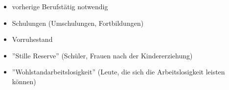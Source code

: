 \documentclass[a4paper]{report}
\begin{document}
\begin{itemize}
\item vorherige Berufstätig notwendig
\item Schulungen (Umschulungen, Fortbildungen)
\item Vorruhestand 
\item ''Stille Reserve'' (Schüler, Frauen nach der Kindererziehung)
\item ''Wohlstandarbeitslosigkeit'' (Leute, die sich die Arbeitslosigkeit leisten können)

\end{itemize}
\end{document}
